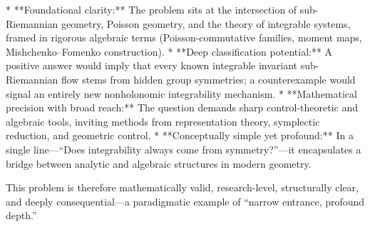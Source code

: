 * **Foundational clarity:** The problem sits at the intersection of sub-Riemannian geometry, Poisson geometry, and the theory of integrable systems, framed in rigorous algebraic terms (Poisson-commutative families, moment maps, Mishchenko–Fomenko construction).
* **Deep classification potential:** A positive answer would imply that every known integrable invariant sub-Riemannian flow stems from hidden group symmetries; a counterexample would signal an entirely new nonholonomic integrability mechanism.
* **Mathematical precision with broad reach:** The question demands sharp control-theoretic and algebraic tools, inviting methods from representation theory, symplectic reduction, and geometric control.
* **Conceptually simple yet profound:** In a single line—“Does integrability always come from symmetry?”—it encapsulates a bridge between analytic and algebraic structures in modern geometry.

This problem is therefore mathematically valid, research-level, structurally clear, and deeply consequential—a paradigmatic example of “narrow entrance, profound depth.”
